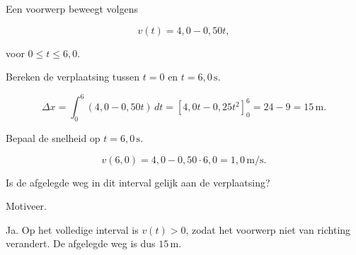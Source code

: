 \documentclass{ximera}
\begin{document}
\begin{oefening}{\oefB\ESS}

Een voorwerp beweegt volgens

\[v(t)=4,0-0,50t,\]

voor $0\leq t\leq6,0$.

\begin{question}

Bereken de verplaatsing tussen $t=0$ en $t=6,0\,\mathrm{s}$.

\begin{oplossing}
\[\Delta x=\int_0^6(4,0-0,50t)\,dt =\left[4,0t-0,25t^2\right]_0^6 =24-9=15\,\mathrm{m}.\]
\end{oplossing}

\end{question}

\begin{question}

Bepaal de snelheid op $t=6,0\,\mathrm{s}$.

\begin{oplossing}
\[v(6,0)=4,0-0,50\cdot6,0=1,0\,\mathrm{m/s}.\]
\end{oplossing}

\end{question}

\begin{question}

Is de afgelegde weg in dit interval gelijk aan de verplaatsing?

Motiveer.

\begin{oplossing}
Ja. Op het volledige interval is \(v(t)>0\), zodat het voorwerp niet van richting verandert. De afgelegde weg is dus \(15\,\mathrm{m}\).
\end{oplossing}

\end{question}

\end{oefening}
\end{document}
